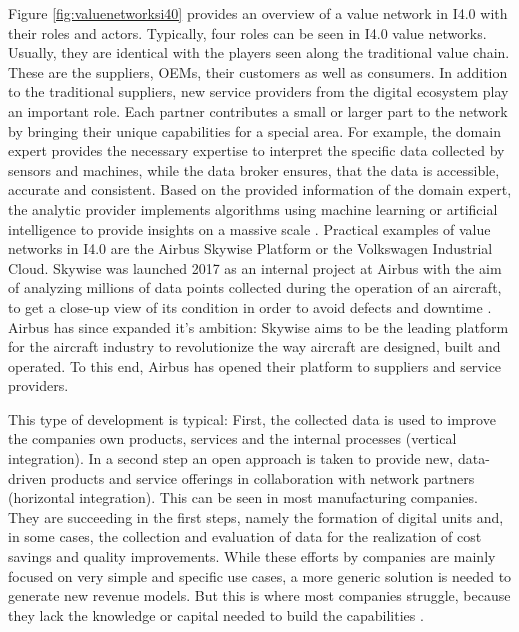 Figure \ref{fig:valuenetworksi40} provides an overview of a value network in \ac{I4.0} with their roles and actors. Typically, four roles can be seen in \ac{I4.0} value networks. Usually, they are identical with the players seen along the traditional value chain. These are the suppliers, OEMs, their customers as well as consumers. In addition to the traditional suppliers, new service providers from the digital ecosystem play an important role. Each partner contributes a small or larger part to the network by bringing their unique capabilities for a special area. For example, the domain expert provides the necessary expertise to interpret the specific data collected by sensors and machines, while the data broker ensures, that the data is accessible, accurate and consistent. Based on the provided information of the domain expert, the analytic provider implements algorithms using machine learning or artificial intelligence to provide insights on a massive scale \cite{Russo2018HowCompetition}. Practical examples of value networks in \ac{I4.0} are the Airbus Skywise Platform or the Volkswagen Industrial Cloud. Skywise was launched 2017 as an internal project at Airbus with the aim of analyzing millions of data points collected during the operation of an aircraft, to get a close-up view of its condition in order to avoid defects and downtime \cite{Hanke2019AirbusWerden}. Airbus has since expanded it's ambition: Skywise aims to be the leading platform for the aircraft industry to revolutionize the way aircraft are designed, built and operated. To this end, Airbus has opened their platform to suppliers and service providers. 

This type of development is typical: First, the collected data is used to improve the companies own products, services and the internal processes (vertical integration). In a second step an open approach is taken to provide new, data-driven products and service offerings in collaboration with network partners (horizontal integration). This can be seen in most manufacturing companies. They are succeeding in the first steps, namely the formation of digital units and, in some cases, the collection and evaluation of data for the realization of cost savings and quality improvements. While these efforts by companies are mainly focused on very simple and specific use cases, a more generic solution is needed to generate new revenue models. But this is where most companies struggle, because they lack the knowledge or capital needed to build the capabilities \cite[p. 19]{Arnold2018DigitaleMittelstand}.

